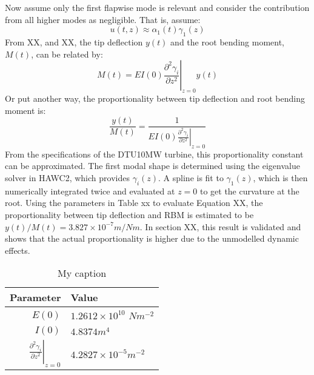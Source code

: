 Now assume only the first flapwise mode is relevant and consider the contribution from all higher modes as negligible. That is, assume:
\begin{equation}
    u(t, z) \approx  \alpha_1(t) \gamma_1(z)
\end{equation}
From XX, and XX, the tip deflection $y(t)$ and the root bending moment, $M(t)$, can be related by:
\begin{equation}
    M(t) = EI(0)\left.\frac{\partial ^2 \gamma_i}{\partial z^2}\right\vert_{z=0}y(t)
\end{equation}
Or put another way, the proportionality between tip deflection and root bending moment is:
\begin{equation}
    \frac{y(t)}{M(t)} = \frac{1}{EI(0)\left.\frac{\partial ^2 \gamma_i}{\partial z^2}\right\vert_{z=0}}
\end{equation}
From the specifications of the DTU10MW turbine, this proportionality constant can be approximated. The first modal shape is determined using the eigenvalue solver in HAWC2, which provides $\gamma_i(z)$. A spline is fit to $\gamma_1(z)$, which is then numerically integrated twice and evaluated at $z=0$ to get the curvature at the root. Using the parameters in Table xx to evaluate Equation XX, the proportionality between tip deflection and RBM is estimated to be $y(t)/M(t) = 3.827 \times 10^{-7} m/Nm$. In section XX, this result is validated and shows that the actual proportionality is higher due to the unmodelled dynamic effects.

\begin{table}[H]
\centering
\caption{My caption}
\label{my-label}
\begin{tabular}{r|l}
\textbf{Parameter} & \textbf{Value} \\ \hline
$E(0)$         & $ 1.2612\times 10^{10}$ $Nm^{-2}$   \\
$I(0)$         &     $4.8374 m^4$  \\
   $\left.\frac{\partial ^2 \gamma_i}{\partial z^2}\right\vert_{z=0} $     &    $4.2827\times 10^{-5} m^{-2}$  
\end{tabular}
\end{table}
\\~\\

